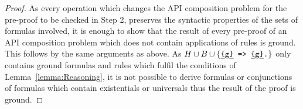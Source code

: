 \begin{proof}
As every operation which changes the API composition problem for the pre-proof to be checked in Step 2, preserves the syntactic properties of the 
sets of formulas involved, it is enough to show that the result of every pre-proof of an API composition problem which does not contain 
applications of \restdesc rules is ground. %
This follows by the same arguments as above. As $H\cup B \cup \{ \texttt{\underline{\{}g\underline{\}} => \underline{\{}g\underline{\}}.}\}$ 
only contains ground formulas and rules which fulfil
the conditions of Lemma~\ref{lemma:Reasoning},
it is not possible to derive formulas or conjunctions of formulas which contain existentials or universals %
thus the result of the proof is ground.
% 
% 
% 
% 
\end{proof}

